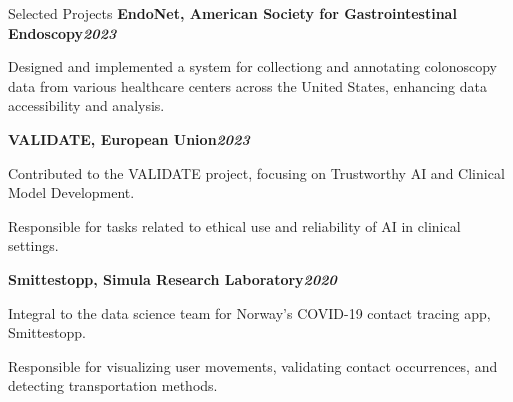 \begin{rubric}{Selected Projects}
%
\entry*[]%
\textbf{EndoNet, American Society for Gastrointestinal Endoscopy\hfill\textit{}\hfill\textit{2023}} \par
\begin{compactitem}
    \item Designed and implemented a system for collectiong and annotating colonoscopy data from various healthcare centers across the United States, enhancing data accessibility and analysis.
    \vspace{-12pt}
\end{compactitem}
%
\entry*[]%
\textbf{VALIDATE, European Union\hfill\textit{2023}}
\begin{compactitem}
    \item Contributed to the VALIDATE project, focusing on Trustworthy AI and Clinical Model Development.
    \item Responsible for tasks related to ethical use and reliability of AI in clinical settings.
    \vspace{-12pt}
\end{compactitem}
%
%
\entry*[]%
\textbf{Smittestopp, Simula Research Laboratory\hfill\textit{2020}} \par
\begin{compactitem}
    \item Integral to the data science team for Norway's COVID-19 contact tracing app, Smittestopp.
    \item Responsible for visualizing user movements, validating contact occurrences, and detecting transportation methods.
    \vspace{-12pt}
\end{compactitem}
%

\end{rubric}

